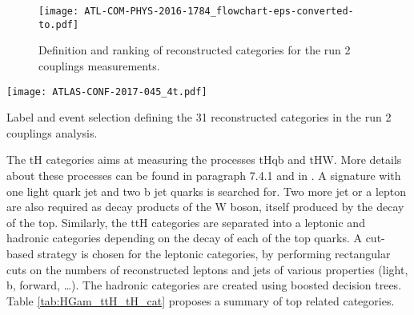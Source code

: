 \begin{figure}[htbp]
\centering
\texttt{[image: ATL-COM-PHYS-2016-1784\_flowchart-eps-converted-to.pdf]}
\caption{\label{fig:orge14adff}
Definition and ranking of reconstructed categories for the run 2 couplings measurements.\cite{ATL-COM-PHYS-2016-1784}}
\end{figure}

\begin{table}
  \centering
  \texttt{[image: ATLAS-CONF-2017-045\_4t.pdf]}
  \caption{Label and event selection defining the 31 reconstructed categories in the run 2 couplings analysis. \cite{ATLAS-CONF-2017-045}}
  \label{HGam_fullReconstructedCategories}
\end{table}

The tH categories aims at measuring the processes tHqb and tHW.
More details about these processes can be found in \cite{CERN-THESIS-2014-122} paragraph 7.4.1 and in \cite{Maltoni:506128}.
A signature with one light quark jet and two b jet quarks is searched for.
Two more jet or a lepton are also required as decay products of the W boson, itself produced by the decay of the top.
Similarly, the ttH categories are separated into a leptonic and hadronic categories depending on the decay of each of the top quarks.
A cut-based strategy is chosen for the leptonic categories, by performing rectangular cuts on the numbers of reconstructed leptons and jets of various properties (light, b, forward, \ldots{}).
The hadronic categories are created using boosted decision trees.
Table \ref{tab:HGam_ttH_tH_cat} proposes a summary of top related categories.


